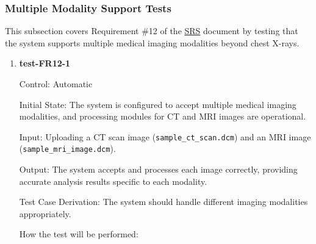 \documentclass[12pt, titlepage]{article}
\begin{document}
\subsubsection{Multiple Modality Support Tests}

This subsection covers Requirement \#12 of the \href{https://github.com/RezaJodeiri/CXR-Capstone/blob/main/docs/SRS/SRS.pdf}{SRS} \citep{SRS}
document by testing that the system supports multiple medical imaging modalities beyond chest X-rays.

\begin{enumerate}

\item \textbf{test-FR12-1} \label{test-FR12-1}

Control: Automatic

Initial State: The system is configured to accept multiple medical imaging modalities, and processing modules for CT and MRI images are operational.

Input: Uploading a CT scan image (\texttt{sample\_ct\_scan.dcm}) and an MRI image (\texttt{sample\_mri\_image.dcm}).

Output: The system accepts and processes each image correctly, providing accurate analysis results specific to each modality.

Test Case Derivation: The system should handle different imaging modalities appropriately.

How the test will be performed:


\end{enumerate}
\end{document}
